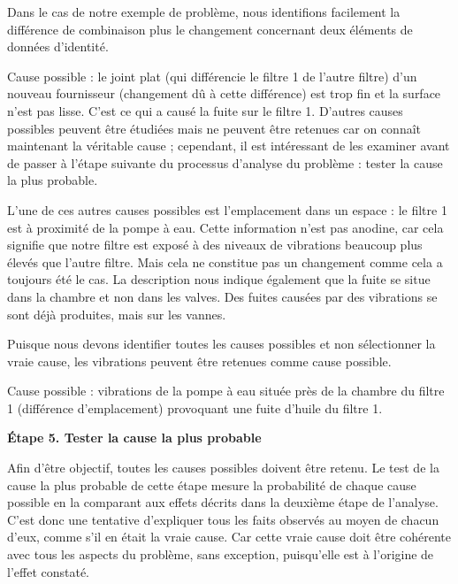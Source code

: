 Dans le cas de notre exemple de problème, nous identifions facilement la différence de combinaison plus le changement concernant deux éléments de données d'identité.
\vspace{0.3cm}

Cause possible : le joint plat (qui différencie le filtre 1 de l'autre filtre) d'un nouveau fournisseur (changement dû à cette différence) est trop fin et la surface n'est pas lisse. C'est ce qui a causé la fuite sur le filtre 1. D'autres causes possibles peuvent être étudiées mais ne peuvent être retenues car on connaît maintenant la véritable cause ; cependant, il est intéressant de les examiner avant de passer à l'étape suivante du processus d'analyse du problème : tester la cause la plus probable.
\vspace{0.3cm}

L'une de ces autres causes possibles est l'emplacement dans un espace : le filtre 1 est à proximité de la pompe à eau. Cette information n'est pas anodine, car cela signifie que notre filtre est exposé à des niveaux de vibrations beaucoup plus élevés que l'autre filtre. Mais cela ne constitue pas un changement comme cela a toujours été le cas. La description nous indique également que la fuite se situe dans la chambre et non dans les valves. Des fuites causées par des vibrations se sont déjà produites, mais sur les vannes.
\vspace{0.3cm}

Puisque nous devons identifier toutes les causes possibles et non sélectionner la vraie cause, les vibrations peuvent être retenues comme cause possible.
\vspace{0.3cm}

Cause possible : vibrations de la pompe à eau située près de la chambre du filtre 1 (différence d'emplacement) provoquant une fuite d'huile du filtre 1.

\vspace{0.3cm}

\textbf{	Étape 5. Tester la cause la plus probable}
\vspace{0.3cm}


Afin d'être objectif, toutes les causes possibles doivent être retenu. Le test de la cause la plus probable de cette étape mesure la probabilité de chaque cause possible en la comparant aux effets décrits dans la deuxième étape de l'analyse. C'est donc une tentative d'expliquer tous les faits observés au moyen de chacun d'eux, comme s'il en était la vraie cause. Car cette vraie cause doit être cohérente avec tous les aspects du problème, sans exception, puisqu'elle est à l'origine de l'effet constaté.
\vspace{0.3cm}

